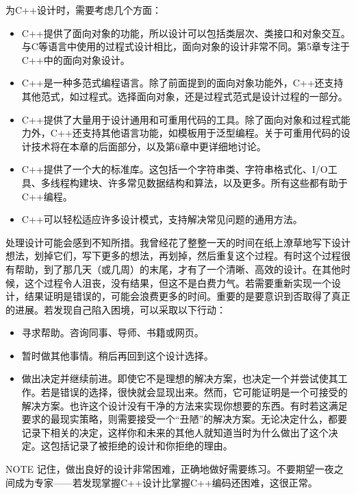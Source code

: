 
为C++设计时，需要考虑几个方面：

\begin{itemize}
\item
C++提供了面向对象的功能，所以设计可以包括类层次、类接口和对象交互。与C等语言中使用的过程式设计相比，面向对象的设计非常不同。第5章专注于C++中的面向对象设计。

\item
C++是一种多范式编程语言。除了前面提到的面向对象功能外，C++还支持其他范式，如过程式。选择面向对象，还是过程式范式是设计过程的一部分。

\item
C++提供了大量用于设计通用和可重用代码的工具。除了面向对象和过程式能力外，C++还支持其他语言功能，如模板用于泛型编程。关于可重用代码的设计技术将在本章的后面部分，以及第6章中更详细地讨论。

\item
C++提供了一个大的标准库。这包括一个字符串类、字符串格式化、I/O工具、多线程构建块、许多常见数据结构和算法，以及更多。所有这些都有助于C++编程。

\item
C++可以轻松适应许多设计模式，支持解决常见问题的通用方法。
\end{itemize}

处理设计可能会感到不知所措。我曾经花了整整一天的时间在纸上潦草地写下设计想法，划掉它们，写下更多的想法，再划掉，然后重复这个过程。有时这个过程很有帮助，到了那几天（或几周）的末尾，才有了一个清晰、高效的设计。在其他时候，这个过程令人沮丧，没有结果，但这不是白费力气。若需要重新实现一个设计，结果证明是错误的，可能会浪费更多的时间。重要的是要意识到否取得了真正的进展。若发现自己陷入困境，可以采取以下行动：

\begin{itemize}
\item
寻求帮助。咨询同事、导师、书籍或网页。

\item
暂时做其他事情。稍后再回到这个设计选择。

\item
做出决定并继续前进。即使它不是理想的解决方案，也决定一个并尝试使其工作。若是错误的选择，很快就会显现出来。然而，它可能证明是一个可接受的解决方案。也许这个设计没有干净的方法来实现你想要的东西。有时若这满足要求的最现实策略，则需要接受一个“丑陋”的解决方案。无论决定什么，都要记录下相关的决定，这样你和未来的其他人就知道当时为什么做出了这个决定。这包括记录了被拒绝的设计和你拒绝的理由。
\end{itemize}

\begin{myNotic}{NOTE}
记住，做出良好的设计非常困难，正确地做好需要练习。不要期望一夜之间成为专家——若发现掌握C++设计比掌握C++编码还困难，这很正常。
\end{myNotic}











